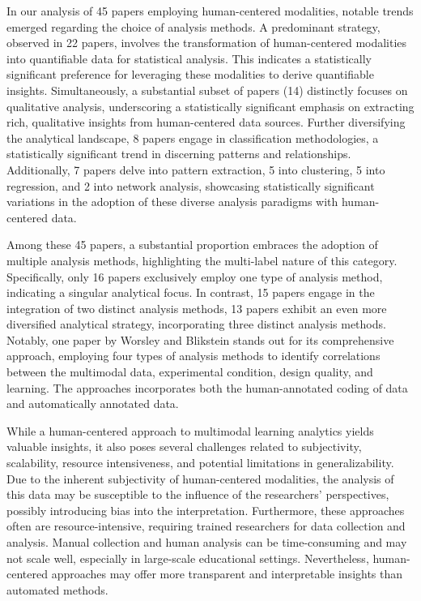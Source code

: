 \documentclass[manuscript,screen,review]{acmart}
\begin{document}
In our analysis of 45 papers employing human-centered modalities, notable trends emerged regarding the choice of analysis methods. A predominant strategy, observed in 22 papers, involves the transformation of human-centered modalities into quantifiable data for statistical analysis. This indicates a statistically significant preference for leveraging these modalities to derive quantifiable insights. Simultaneously, a substantial subset of papers (14) distinctly focuses on qualitative analysis, underscoring a statistically significant emphasis on extracting rich, qualitative insights from human-centered data sources. Further diversifying the analytical landscape, 8 papers engage in classification methodologies, a statistically significant trend in discerning patterns and relationships. Additionally, 7 papers delve into pattern extraction, 5 into clustering, 5 into regression, and 2 into network analysis, showcasing statistically significant variations in the adoption of these diverse analysis paradigms with human-centered data.

Among these 45 papers, a substantial proportion embraces the adoption of multiple analysis methods, highlighting the multi-label nature of this category. Specifically, only 16 papers exclusively employ one type of analysis method, indicating a singular analytical focus. In contrast, 15 papers engage in the integration of two distinct analysis methods, 13 papers exhibit an even more diversified analytical strategy, incorporating three distinct analysis methods. Notably, one paper by Worsley and Blikstein \cite{3095923626} stands out for its comprehensive approach, employing four types of analysis methods to identify correlations between the multimodal data, experimental condition, design quality, and learning. The approaches incorporates both the human-annotated coding of data and automatically annotated data.

While a human-centered approach to multimodal learning analytics yields valuable insights, it also poses several challenges related to subjectivity, scalability, resource intensiveness, and potential limitations in generalizability. Due to the inherent subjectivity of human-centered modalities, the analysis of this data may be susceptible to the influence of the researchers' perspectives, possibly introducing bias into the interpretation. Furthermore, these approaches often are resource-intensive, requiring trained researchers for data collection and analysis. Manual collection and human analysis can be time-consuming and may not scale well, especially in large-scale educational settings. Nevertheless, human-centered approaches may offer more transparent and interpretable insights than automated methods.
\end{document}
